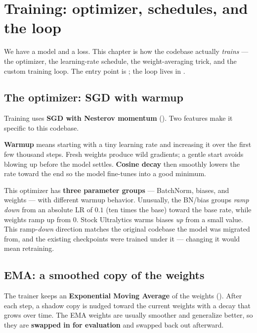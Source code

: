 \chapter{Training: optimizer, schedules, and the loop}

We have a model and a loss. This chapter is how the codebase actually \emph{trains} ---
the optimizer, the learning-rate schedule, the weight-averaging trick, and the custom
training loop. The entry point is ; the loop lives in
.

\section{The optimizer: SGD with warmup}
Training uses \textbf{SGD with Nesterov momentum} (). Two
features make it specific to this codebase.


\begin{teacher}
\textbf{Warmup} means starting with a tiny learning rate and increasing it over the first
few thousand steps. Fresh weights produce wild gradients; a gentle start avoids blowing up
before the model settles. \textbf{Cosine decay} then smoothly lowers the rate toward the
end so the model fine-tunes into a good minimum.
\end{teacher}

\begin{why}
This optimizer has \textbf{three parameter groups} --- BatchNorm, biases, and weights ---
with different warmup behavior. Unusually, the BN/bias groups \emph{ramp down} from an
absolute LR of $0.1$ (ten times the base) toward the base rate, while weights ramp up from
0. Stock Ultralytics warms biases \emph{up} from a small value. This ramp-\emph{down}
direction matches the original codebase the model was migrated from, and the existing
checkpoints were trained under it --- changing it would mean retraining.
\end{why}

\section{EMA: a smoothed copy of the weights}
The trainer keeps an \textbf{Exponential Moving Average} of the weights
(). After each step, a shadow copy is nudged toward the current
weights with a decay that grows over time. The EMA weights are usually smoother and
generalize better, so they are \textbf{swapped in for evaluation} and swapped back out
afterward.

